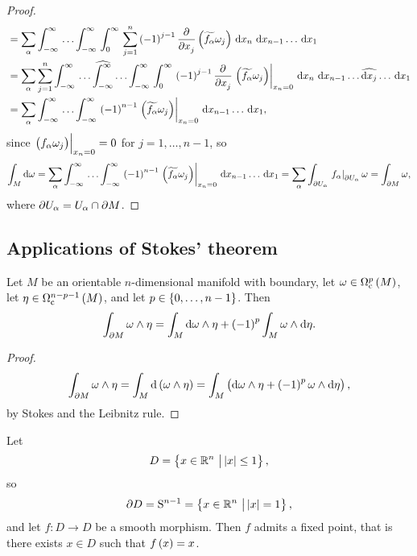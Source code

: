 \begin{proof}
\begin{align*}
& = \sum_\alpha \intd{-\infty}{\infty}{\dots \intd{-\infty}{\infty}{\intd{0}{\infty}{\sum_{j = 1}^n \br{-1}^{j - 1}\dpd{}{x_j}\br{\widetilde{f_\alpha}\omega_j}}{x_n}}{x_{n - 1} \dots}}{x_1} \\
& = \sum_\alpha \sum_{j = 1}^n \intd{-\infty}{\infty}{\dots \widehat{\int_{-\infty}^\infty} \dots \intd{-\infty}{\infty}{\intd{0}{\infty}{\br{-1}^{j - 1}\dpd{}{x_j}\eval{\br{\widetilde{f_\alpha}\omega_j}}_{x_n = 0}}{x_n}}{x_{n - 1} \dots \widehat{\d x_j} \dots}}{x_1} \\
& = \sum_\alpha \intd{-\infty}{\infty}{\dots \intd{-\infty}{\infty}{\br{-1}^{n - 1}\eval{\br{\widetilde{f_\alpha}\omega_j}}_{x_n = 0}}{x_{n - 1} \dots}}{x_1},
\end{align*}
since $ \eval{\br{f_\alpha\omega_j}}_{x_n = 0} = 0 $ for $ j = 1, \dots, n - 1 $, so
$$ \int_M \d\omega = \sum_\alpha \intd{-\infty}{\infty}{\dots \intd{-\infty}{\infty}{\br{-1}^{n - 1}\eval{\br{\widetilde{f_\alpha}\omega_j}}_{x_n = 0}}{x_{n - 1} \dots}}{x_1} = \sum_\alpha \int_{\da U_\alpha} \eval{f_\alpha}_{\da U_\alpha}\omega = \int_{\da M} \omega, $$
where $ \partial U_\alpha = U_\alpha \cap \partial M $.
\end{proof}

\pagebreak

\subsection{Applications of Stokes' theorem}


\begin{theorem}
Let $ M $ be an orientable $ n $-dimensional manifold with boundary, let $ \omega \in \Omega_\c^p\br{M} $, let $ \eta \in \Omega_\c^{n - p - 1}\br{M} $, and let $ p \in \cbr{0, \dots, n - 1} $. Then
$$ \int_{\da M} \omega \wedge \eta = \int_M \d\omega \wedge \eta + \br{-1}^p\int_M \omega \wedge \d\eta. $$
\end{theorem}

\begin{proof}
$$ \int_{\da M} \omega \wedge \eta = \int_M \d\br{\omega \wedge \eta} = \int_M \br{\d\omega \wedge \eta + \br{-1}^p\omega \wedge \d\eta}, $$
by Stokes and the Leibnitz rule.
\end{proof}

\begin{theorem}
Let
$$ D = \cbr{x \in \RR^n \st \abs{x} \le 1}, $$
so
$$ \da D = \S^{n - 1} = \cbr{x \in \RR^n \st \abs{x} = 1}, $$
and let $ f : D \to D $ be a smooth morphism. Then $ f $ admits a fixed point, that is there exists $ x \in D $ such that $ f\br{x} = x $.
\end{theorem}

